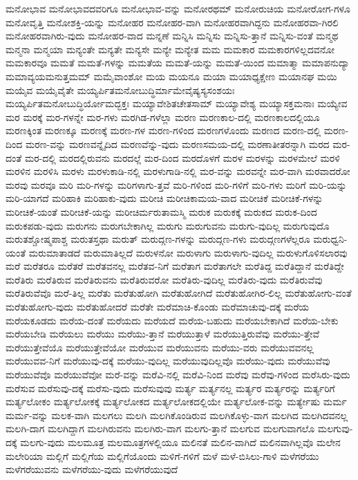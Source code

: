 {ಮನೋಭಾವ
ಮನೋಭಾವದವರಿಗೂ
ಮನೋಭಾವ-ವನ್ನು
ಮನೋರಥಮ್
ಮನೋರುಚಿಯ
ಮನೋರೋಗ-ಗಳೂ
ಮನೋವೃತ್ತಿ
ಮನೋಶಕ್ತಿ-ಯನ್ನು
ಮನೋಹರ
ಮನೋಹರ-ವಾಗಿ
ಮನೋಹರವಾಗಿದ್ದನು
ಮನೋಹರವಾ-ಗಿರಲಿ
ಮನೋಹರವಾಗಿರು-ವುದು
ಮನೋಹರ-ವಾದ
ಮನ್ನಣೆ
ಮನ್ನಿಸಿ
ಮನ್ನಿಸು
ಮನ್ನಿಸು-ತ್ತಾನೆ
ಮನ್ನಿಸು-ವಂತೆ
ಮನ್ಮಥ
ಮನ್ಮನಾ
ಮನ್ಮಯಾ
ಮನ್ಯಂತೇ
ಮನ್ಯತೇ
ಮನ್ಯಸೇ
ಮನ್ಯೇ
ಮನ್ಯೇತ
ಮಮ
ಮಮಕಾರ
ಮಮಕಾರಗಳಿಲ್ಲದವನೋ
ಮಮಕಾರವೂ
ಮಮತೆ
ಮಮತೆ-ಗಳನ್ನು
ಮಮತೆಯ
ಮಮತೆ-ಯನ್ನು
ಮಮತೆ-ಯಿಂದ
ಮಮಾತ್ಮಾ
ಮಮಾಪನುದ್ಯಾ
ಮಮಾವ್ಯಯಮನುತ್ತಮಮ್
ಮಮೈವಾಂಶೋ
ಮಯ
ಮಯನೂ
ಮಯಾ
ಮಯಾಧ್ಯಕ್ಷೇಣ
ಮಯಾನಘ
ಮಯಿ
ಮಯೈವ
ಮಯೈವೈತೇ
ಮಯ್ಯರ್ಪಿತಮನೋಬುದ್ಧಿರ್ಮಾಮೇವೈಷ್ಯಸ್ಯಸಂಶಯಃ
ಮಯ್ಯರ್ಪಿತಮನೋಬುದ್ಧಿರ್ಯೋಮದ್ಭಕ್ತಃ
ಮಯ್ಯಾವೇಶಿತಚೇತಸಾಮ್
ಮಯ್ಯಾವೇಶ್ಯ
ಮಯ್ಯಾಸಕ್ತಮನಾಃ
ಮಯ್ಯೇವ
ಮರ
ಮರಕ್ಕೆ
ಮರ-ಗಳನ್ನೇ
ಮರ-ಗಳು
ಮರಗಿಡ-ಗಳೆಲ್ಲಾ
ಮರಣ
ಮರಣಕಾಲ-ದಲ್ಲಿ
ಮರಣಕಾಲದಲ್ಲಿಯೂ
ಮರಣಕ್ಕಿಂತ
ಮರಣಕ್ಕೂ
ಮರಣಕ್ಕೆ
ಮರಣ-ಗಳ
ಮರಣ-ಗಳಿಂದ
ಮರಣಗಳೊಂದು
ಮರಣದ
ಮರಣ-ದಲ್ಲಿ
ಮರಣ-ದಿಂದ
ಮರಣ-ವನ್ನು
ಮರಣವನ್ನೈದಿದ
ಮರಣವೆನ್ನು-ವುದು
ಮರಣಸಮಯ-ದಲ್ಲಿ
ಮರಣಾತೀತರನ್ನಾಗಿ
ಮರದ
ಮರ-ದಂತೆ
ಮರ-ದಲ್ಲಿ
ಮರದಲ್ಲಿರುವನು
ಮರದಲ್ಲೆ
ಮರ-ದಿಂದ
ಮರದೊಳಗೆ
ಮರಳ
ಮರಳನ್ನು
ಮರಳಮೇಲೆ
ಮರಳಿ
ಮರಳಿನ
ಮರಳಿಸಿ
ಮರಳು
ಮರಳುಕಾಡಿ-ನಲ್ಲಿ
ಮರಳುಗಾಡಿ-ನಲ್ಲಿ
ಮರ-ವನ್ನು
ಮರವನ್ನೇ
ಮರ-ವಾಗಿ
ಮರವಾದರೋ
ಮರವು
ಮರವೂ
ಮರಿ
ಮರಿ-ಗಳನ್ನು
ಮರಿಗಳಾಗು-ತ್ತವೆ
ಮರಿ-ಗಳಿಂದ
ಮರಿ-ಗಳಿಗೆ
ಮರಿ-ಗಳು
ಮರಿಗೆ
ಮರಿ-ಯನ್ನು
ಮರಿ-ಯಾಗದೆ
ಮರಿಹಾಕಿ
ಮರಿಹಾಕು-ವುದು
ಮರೀಚಿ
ಮರೀಚಿಕಾಮಯ-ವಾದ
ಮರೀಚಿಕೆ
ಮರೀಚಿಕೆ-ಗಳನ್ನು
ಮರೀಚಿಕೆ-ಯಂತೆ
ಮರೀಚಿಕೆ-ಯನ್ನು
ಮರೀಚಿರ್ಮರುತಾಮಸ್ಮಿ
ಮರುಕ
ಮರುಕಕ್ಕೆ
ಮರುಕದ
ಮರುಕ-ದಿಂದ
ಮರುಕಪಡು-ವುದು
ಮರುಗನು
ಮರುಗಬೇಕಾಗಿಲ್ಲ
ಮರುಗು
ಮರುಗುವನು
ಮರುಗು-ವುದಿಲ್ಲ
ಮರುಗುವುದೊ
ಮರುತಶ್ಚೋಷ್ಮಪಾಶ್ಚ
ಮರುತಸ್ತಥಾ
ಮರುತ್
ಮರುದ್ಗಣ-ಗಳನ್ನು
ಮರುದ್ಗಣ-ಗಳು
ಮರುದ್ಗಣಗಳೆಲ್ಲರೂ
ಮರುಧ್ವನಿ-ಯಂತೆ
ಮರುಮಾತಾಡದೆ
ಮರುಮಾತಿಲ್ಲದೆ
ಮರುಳನೋ
ಮರುಳಾಗು
ಮರುಳಾಗು-ವುದಿಲ್ಲ
ಮರುಳುಗೊಳಿಸಲಾರವು
ಮರೆ
ಮರೆತರೂ
ಮರೆತರೆ
ಮರೆತವನಲ್ಲ
ಮರೆತವ-ನಿಗೆ
ಮರೆತಾಗ
ಮರೆತಾಗಲೇ
ಮರೆತಿದ್ದ
ಮರೆತಿದ್ದಾನೆ
ಮರೆತಿದ್ದೇ
ಮರೆತಿರು
ಮರೆತಿರುವ
ಮರೆತಿರುವನು
ಮರೆತಿರುವರೋ
ಮರೆತಿರು-ವುದಿಲ್ಲ
ಮರೆತಿರು-ವುದು
ಮರೆತಿರುವೆವು
ಮರೆತಿರುವೆವೊ
ಮರೆ-ತಿಲ್ಲ
ಮರೆತು
ಮರೆತುಹೋಗಿ
ಮರೆತುಹೋಗಿದೆ
ಮರೆತುಹೋಗಿರ-ಲಿಲ್ಲ
ಮರೆತುಹೋಗು-ವಂತೆ
ಮರೆತುಹೋಗು-ವುದು
ಮರೆತುಹೋದರೆ
ಮರೆತೇ
ಮರೆಮಾಚಿ-ಕೊಂಡು
ಮರೆಮಾಚುವು-ದಕ್ಕೆ
ಮರೆಯ
ಮರೆಯಕೂಡದು
ಮರೆಯ-ದಂತೆ
ಮರೆಯದು
ಮರೆಯದೆ
ಮರೆಯ-ಬಹುದು
ಮರೆಯಬೇಕಾಗಿದೆ
ಮರೆಯ-ಬೇಕು
ಮರೆಯಬೇಡಿ
ಮರೆಯಲು
ಮರೆಯು
ಮರೆಯು-ತ್ತಾನೆ
ಮರೆಯುತ್ತಾಳೆ
ಮರೆಯುತ್ತಿರುವೆವು
ಮರೆಯು-ತ್ತೇವೆ
ಮರೆಯುತ್ತೇವೆಯೊ
ಮರೆಯುತ್ತೇವೆಯೋ
ಮರೆಯುವ
ಮರೆಯುವನು
ಮರೆಯು-ವರು
ಮರೆಯುವವನಲ್ಲ
ಮರೆಯುವವ-ನಿಗೆ
ಮರೆಯುವು-ದಕ್ಕೆ
ಮರೆಯು-ವುದಿಲ್ಲ
ಮರೆಯುವುದಿಲ್ಲವೊ
ಮರೆಯು-ವುದು
ಮರೆಯುವೆವು
ಮರೆಯುವೆವೊ
ಮರೆಯುವೆವೋ
ಮರೆ-ವನ್ನು
ಮರೆವಿ-ನಲ್ಲಿ
ಮರೆವಿ-ನಿಂದ
ಮರೆವು
ಮರೆವು-ಗಳಿಂದ
ಮರೆಸಿರು-ವುದು
ಮರೆಸುವ
ಮರೆಸುವು-ದಕ್ಕೆ
ಮರೆಸು-ವುದು
ಮರೆಸುವುವು
ಮರ್ತ್ಯ
ಮರ್ತ್ಯನಲ್ಲ
ಮರ್ತ್ಯರ
ಮರ್ತ್ಯರನ್ನು
ಮರ್ತ್ಯರಿಗೆ
ಮರ್ತ್ಯಲೋಕಂ
ಮರ್ತ್ಯಲೋಕಕ್ಕೆ
ಮರ್ತ್ಯಲೋಕದ
ಮರ್ತ್ಯಲೋಕದಲ್ಲಿಯೇ
ಮರ್ತ್ಯಲೋಕ-ವನ್ನು
ಮರ್ತ್ಯೇಷು
ಮರ್ಮ
ಮರ್ಮ-ವನ್ನು
ಮಲಕ-ವಾಗಿ
ಮಲಗಲು
ಮಲಗಿ
ಮಲಗಿಕೊಂಡಿರುವ
ಮಲಗಿಕೊಳ್ಳು-ವಾಗ
ಮಲಗಿದ
ಮಲಗಿದವನಲ್ಲ
ಮಲಗಿ-ದಾಗ
ಮಲಗಿದ್ದಾಗ
ಮಲಗಿರುವನು
ಮಲಗಿರು-ವಾಗ
ಮಲಗು-ತ್ತಾನೆ
ಮಲಗುವ
ಮಲಗುವಾಗಲೊ
ಮಲಗುವು-ದಕ್ಕೆ
ಮಲಗು-ವುದು
ಮಲಮೂತ್ರ
ಮಲಮೂತ್ರಗಳಲ್ಲಿಯೂ
ಮಲಿನತೆ
ಮಲಿನ-ವಾಗಿದೆ
ಮಲಿನವಾಗಿಲ್ಲವೊ
ಮಲೇನ
ಮಲೇರಿಯಾ
ಮಲ್ಲಿಗೆ
ಮಲ್ಲಿಗೆಯ
ಮಲ್ಲಿಗೆಯೊಂದು
ಮಳಿಗೆ-ಗಳಿಗೆ
ಮಳೆ
ಮಳೆ-ಬಿಸಿಲು-ಗಾಳಿ
ಮಳೆಗರೆಯು
ಮಳೆಗರೆಯುವನು
ಮಳೆಗರೆಯು-ವುದು
ಮಳೆಗರೆಯುವುದೆ
}

